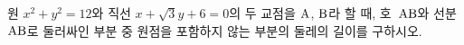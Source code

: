 원 $x^2+y^2=12$와 직선 $x+\sqrt{3}y+6=0$의 두 교점을 $\mathrm{A}$, $\mathrm{B}$라 할 때, 호~$\mathrm{AB}$와 선분~$\mathrm{AB}$로 둘러싸인 부분 중 원점을 포함하지 않는 부분의 둘레의 길이를 구하시오.
